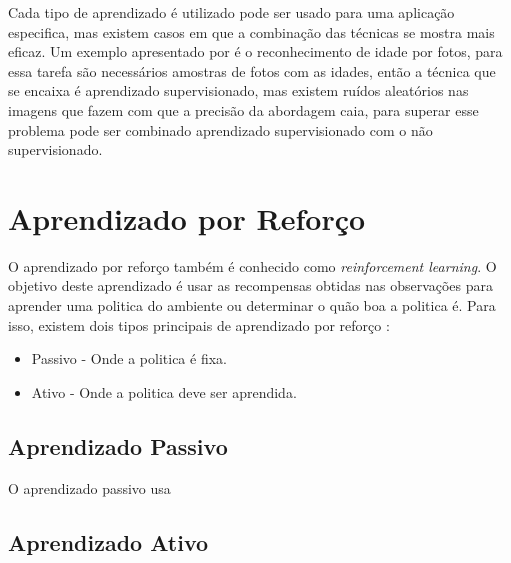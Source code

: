 Cada tipo de aprendizado é utilizado pode ser usado para uma aplicação especifica, mas existem casos em que a combinação das técnicas se mostra mais eficaz. Um exemplo apresentado por \cite{intelligence2003modern} é o reconhecimento de idade por fotos, para essa tarefa são necessários amostras de fotos com as idades, então a técnica que se encaixa é aprendizado supervisionado, mas existem ruídos aleatórios nas imagens que fazem com que a precisão da abordagem caia, para superar esse problema pode ser combinado aprendizado supervisionado com o não supervisionado.

\section{Aprendizado por Reforço}

O aprendizado por reforço também é conhecido como \textit{reinforcement learning}. O objetivo deste aprendizado é usar as recompensas obtidas nas observações para aprender uma politica do ambiente ou determinar o quão boa a politica é. Para isso, existem dois tipos principais de aprendizado por reforço \cite{intelligence2003modern}:

\begin{itemize}
	\item Passivo - Onde a politica é fixa.
	\item Ativo - Onde a politica deve ser aprendida.
\end{itemize}

\subsection{Aprendizado Passivo}

O aprendizado passivo usa 


\subsection{Aprendizado Ativo}




